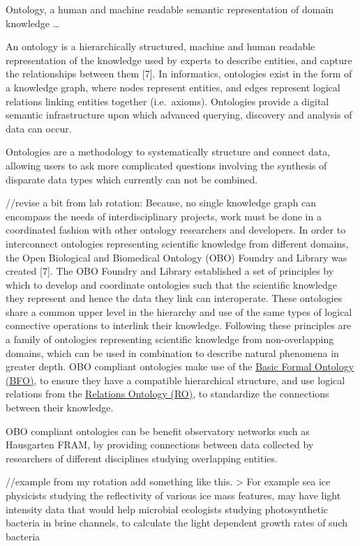 \documentclass[]{article}
\begin{document}
Ontology, a human and machine readable semantic representation of domain
knowledge \ldots{}

An ontology is a hierarchically structured, machine and human readable
representation of the knowledge used by experts to describe entities,
and capture the relationships between them {[}7{]}. In informatics,
ontologies exist in the form of a knowledge graph, where nodes represent
entities, and edges represent logical relations linking entities
together (i.e.~axioms). Ontologies provide a digital semantic
infrastructure upon which advanced querying, discovery and analysis of
data can occur.

Ontologies are a methodology to systematically structure and connect
data, allowing users to ask more complicated questions involving the
synthesis of disparate data types which currently can not be combined.

//revise a bit from lab rotation: Because, no single knowledge graph can
encompass the needs of interdisciplinary projects, work must be done in
a coordinated fashion with other ontology researchers and developers. In
order to interconnect ontologies representing scientific knowledge from
different domains, the Open Biological and Biomedical Ontology (OBO)
Foundry and Library was created {[}7{]}. The OBO Foundry and Library
established a set of principles by which to develop and coordinate
ontologies such that the scientific knowledge they represent and hence
the data they link can interoperate. These ontologies share a common
upper level in the hierarchy and use of the same types of logical
connective operations to interlink their knowledge. Following these
principles are a family of ontologies representing scientific knowledge
from non-overlapping domains, which can be used in combination to
describe natural phenomena in greater depth. OBO compliant ontologies
make use of the \href{https://github.com/BFO-ontology/BFO}{Basic Formal
Ontology (BFO)}, to ensure they have a compatible hierarchical
structure, and use logical relations from the
\href{https://github.com/oborel/obo-relations}{Relations Ontology (RO)},
to standardize the connections between their knowledge.

OBO compliant ontologies can be benefit observatory networks such as
Hausgarten FRAM, by providing connections between data collected by
researchers of different disciplines studying overlapping entities.

//example from my rotation add something like this. \textgreater{} For
example sea ice physicists studying the reflectivity of various ice mass
features, may have light intensity data that would help microbial
ecologists studying photosynthetic bacteria in brine channels, to
calculate the light dependent growth rates of such bacteria
\end{document}
